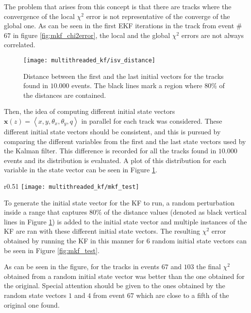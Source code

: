 The problem that arises from this concept is that there are tracks where the convergence of the local $\chi^2$ error is not representative of the converge of the global one.
As can be seen in the first EKF iterations in the track from event \#$67$ in figure \ref{fig:mkf_chi2error}, the local and the global $\chi^2$ errors are not always correlated. %

    \begin{figure}[ht]
        \centering
        \texttt{[image: multithreaded\_kf/isv\_distance]}
        \caption{\label{fig:mkf_isv_distance} Distance between the first and the last initial vectors for the tracks found in $10.000$ events. The black lines mark a region where $80\%$ of the distances are contained.}
    \end{figure}

Then, the idea of computing different initial state vectors $\mathbf{x}(z) = \left<x, y, \theta_x, \theta_y, q\right>$ in parallel for each track was considered.
These different initial state vectors should be consistent, and this is pursued by comparing the different variables from the first and the last state vectors used by the Kalman filter.
This difference is recorded for all the tracks found in $10.000$ events and its distribution is evaluated.
A plot of this distribution for each variable in the state vector can be seen in Figure \ref{fig:mkf_isv_distance}.

    \begin{wrapfigure}{r}{0.51\textwidth}
        \centering
        \texttt{[image: multithreaded\_kf/mkf\_test]}
        \caption{\label{fig:mkf_test} Local $\chi^2$ errors starting from $6$ random initial state vectors compared with the original in events \#$5$, \#$67$ and \#$103$ for $30$ KF iterations.}
    \end{wrapfigure}

To generate the initial state vector for the KF to run, a random perturbation inside a range that captures $80\%$ of the distance values (denoted as black vertical lines in Figure \ref{fig:mkf_isv_distance}) is added to the initial state vector and multiple instances of the KF are ran with these different initial state vectors. The resulting $\chi^2$ error obtained by running the KF in this manner for $6$ random initial state vectors can be seen in Figure \ref{fig:mkf_test}.

As can be seen in the figure, for the tracks in events $67$ and $103$ the final $\chi^2$ obtained from a random initial state vector was better than the one obtained for the original.
Special attention should be given to the ones obtained by the random state vectors $1$ and $4$ from event $67$ which are close to a fifth of the original one found.


